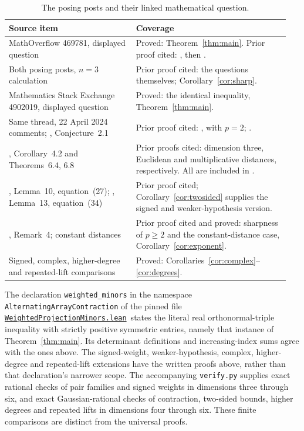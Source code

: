 \documentclass[11pt]{article}
\newcommand{\leanfile}{\href{https://github.com/the-omega-institute/trureturing/blob/c55f6f7c7d7e3cf46b0a7da9efbba687448b29aa/D5/S3/Geometry/ProbabilityTransport/WeightedProjectionMinors.lean}{\texttt{WeightedProjectionMinors.lean}}}
\begin{document}
\begin{table}[ht]
\centering\small
\begin{tabular}{@{}p{0.43\linewidth}p{0.52\linewidth}@{}}
\toprule
Source item & Coverage \\
\midrule
MathOverflow 469781, displayed question & Proved: Theorem~\ref{thm:main}. Prior proof cited: \cite[Theorem~6.2]{lyons}, then \cite[Lemma~10]{mb1}.\\
Both posing posts, $n=3$ calculation & Prior proof cited: the questions themselves; Corollary~\ref{cor:sharp}.\\
Mathematics Stack Exchange 4902019, displayed question & Proved: the identical inequality, Theorem~\ref{thm:main}.\\
Same thread, 22 April 2024 comments; \cite{distances}, Conjecture~2.1 & Prior proof cited: \cite[Theorem~2]{mb1}, with $p=2$; \cite[Theorem~1]{mb4}.\\
\cite{distances}, Corollary~4.2 and Theorems~6.4, 6.8 & Prior proofs cited: dimension three, Euclidean and multiplicative distances, respectively. All are included in \cite[Theorem~2]{mb1}.\\
\cite{mb1}, Lemma~10, equation~(27); \cite{mb4}, Lemma~13, equation~(34) & Prior proof cited; Corollary~\ref{cor:twosided} supplies the signed and weaker-hypothesis version.\\
\cite{mb1,mb4}, Remark~4; constant distances & Prior proof cited and proved: sharpness of $p\ge2$ and the constant-distance case, Corollary~\ref{cor:exponent}.\\
Signed, complex, higher-degree and repeated-lift comparisons & Proved: Corollaries~\ref{cor:complex}--\ref{cor:degrees}.\\
\bottomrule
\end{tabular}
\caption{The posing posts and their linked mathematical question.}
\label{tab:coverage}
\end{table}

The declaration \texttt{weighted\_minors} in the namespace
\texttt{AlternatingArrayContraction} of the pinned file \leanfile\ states
the literal real orthonormal-triple inequality with strictly positive
symmetric entries, namely that instance of Theorem~\ref{thm:main}.
Its determinant definitions and increasing-index sums agree with the ones
above. The signed-weight, weaker-hypothesis, complex, higher-degree and
repeated-lift extensions have the written proofs above, rather than that
declaration's narrower scope. The accompanying \texttt{verify.py} supplies
exact rational checks of pair families and signed weights in dimensions
three through six, and exact Gaussian-rational checks of contraction,
two-sided bounds, higher degrees and repeated lifts in dimensions four
through six. These finite comparisons are distinct from the universal proofs.
\end{document}

